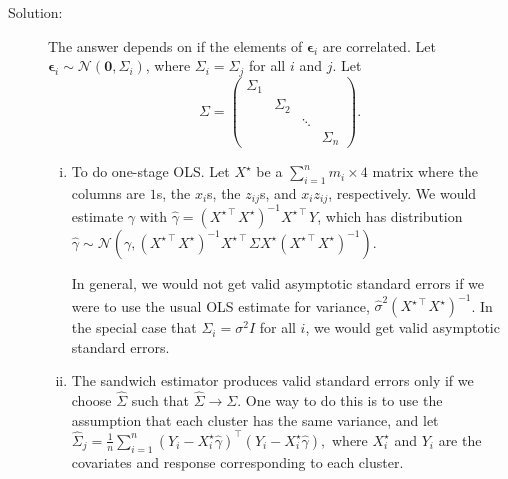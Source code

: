 \documentclass[11pt, letterpaper]{article}
\begin{document}
\begin{enumerate}[(a)]
\begin{description}
\item[Solution:] The answer depends on if the elements of $\bm\epsilon_i$ are
  correlated. Let $\bm\epsilon_i \sim \mathcal{N}\left(\bm 0, \Sigma_i\right)$,
  where $\Sigma_i = \Sigma_j$ for all $i$ and $j$. Let
  \begin{equation}
    \Sigma = \begin{pmatrix}
      \Sigma_1 & & &\\
      & \Sigma_2 & &\\
      & & \ddots &\\
      & & & \Sigma_n      
    \end{pmatrix}.
  \end{equation}
  
  \begin{enumerate}[i.]
  \item To do one-stage OLS. Let $X^\star$ be a $\sum_{i=1}^n m_i \times 4$
    matrix where the columns are $1$s, the $x_i$s, the $z_{ij}$s, and
    $x_iz_{ij}$, respectively. We would estimate $\gamma$ with
    $\hat{\gamma} =
    \left(X^{\star\intercal}X^\star\right)^{-1}X^{\star\intercal}Y$, which has
    distribution
    $\hat{\gamma} \sim \mathcal{N}\left(\gamma,
      \left(X^{\star\intercal}X^\star\right)^{-1}X^{\star\intercal}\Sigma
      X^{\star}\left(X^{\star\intercal}X^\star\right)^{-1}\right)$.

    In general, we would not get valid asymptotic standard errors if we were to
    use the usual OLS estimate for variance,
    $\hat{\sigma}^2\left(X^{\star\intercal} X^\star\right)^{-1}$. In the
    special case that $\Sigma_i = \sigma^2I$ for all $i$, we would get valid
    asymptotic standard errors.
  \item The sandwich estimator produces valid standard errors only if
    we choose $\hat{\Sigma}$ such that $\hat{\Sigma} \rightarrow \Sigma$. One
    way to do this is to use the assumption that each cluster has the same
    variance, and let
    $\hat{\Sigma}_j = \frac{1}{n}\sum_{i=1}^n\left(Y_i -
      X^\star_i\hat{\gamma}\right)^\intercal\left( Y_i - X^\star_i\hat{\gamma}
    \right),$ where $X^\star_i$ and $Y_i$ are the covariates and response
    corresponding to each cluster.


\end{enumerate}
\end{description}
\end{enumerate}
\end{document}
